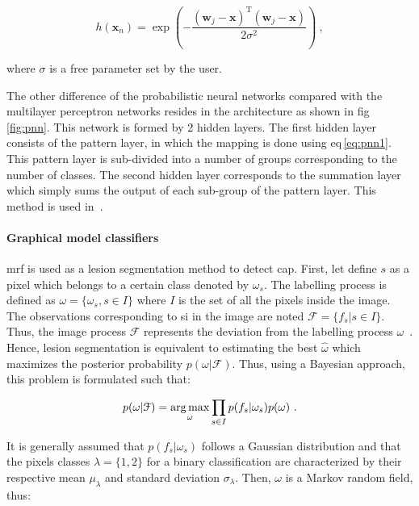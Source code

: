 \begin{equation}
	h(\mathbf{x}_n) = \exp \left( - \frac{ (\mathbf{w}_j - \mathbf{x})^{\text{T}}(\mathbf{w}_j - \mathbf{x}) }{2\sigma^2} \right) \ ,
	\label{eq:pnn1}
\end{equation}

\noindent where $\sigma$ is a free parameter set by the user.

The other difference of the probabilistic neural networks compared with the multilayer perceptron networks resides in the architecture as shown in \acs{fig}\,\ref{fig:pnn}.
This network is formed by 2 hidden layers.
The first hidden layer consists of the pattern layer, in which the mapping is done using \acs{eq}\,\eqref{eq:pnn1}.
This pattern layer is sub-divided into a number of groups corresponding to the number of classes.
The second hidden layer corresponds to the summation layer which simply sums the output of each sub-group of the pattern layer.
This method is used in~\cite{Ampeliotis2007,Ampeliotis2008,Viswanath2011}.

\paragraph{Graphical model classifiers}
\Ac{mrf} is used as a lesion segmentation method to detect \ac{cap}.
First, let define $s$ as a pixel which belongs to a certain class denoted by $\omega_s$.
The labelling process is defined as $\omega = \{\omega_s, s \in I\}$ where $I$ is the set of all the pixels inside the image.
The observations corresponding to \ac{si} in the image are noted $\mathcal{F} = \{ f_s | s \in I \}$.
Thus, the image process $\mathcal{F}$ represents the deviation from the labelling process $\omega$~\cite{Kato2001}.
Hence, lesion segmentation is equivalent to estimating the best $\hat{\omega}$ which maximizes the posterior probability $p(\omega|\mathcal{F})$.
Thus, using a Bayesian approach, this problem is formulated such that:

\begin{equation}
	p(\omega|\mathcal{F}) = \operatorname*{arg\,max}_{\omega} \prod_{s \in I} p(f_s | \omega_s) p(\omega) \ .
	\label{eq:mrf1}
\end{equation}

It is generally assumed that $p(f_s | \omega_s)$ follows a Gaussian distribution and that the pixels classes $\lambda = \{1,2\}$ for a binary classification are characterized by their respective mean $\mu_{\lambda}$ and standard deviation $\sigma_{\lambda}$.
Then, $\omega$ is a Markov random field, thus:

